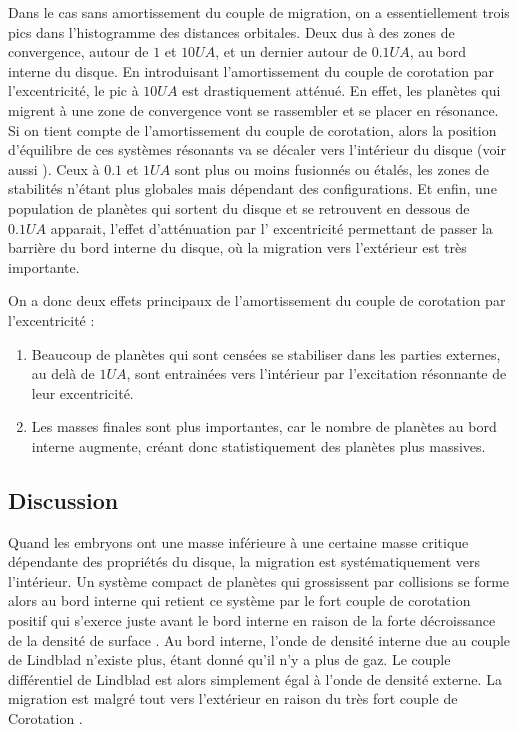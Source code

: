 Dans le cas sans amortissement du couple de migration, on a essentiellement trois pics dans l'histogramme des distances orbitales. Deux dus à des zones de convergence, autour de $1$ et $10\unit{UA}$, et un dernier autour de $0.1\unit{UA}$, au bord interne du disque. En introduisant l'amortissement du couple de corotation par l'excentricité, le pic à $10\unit{UA}$ est drastiquement atténué. En effet, les planètes qui migrent à une zone de convergence vont se rassembler et se placer en résonance. Si on tient compte de l'amortissement du couple de corotation, alors la position d'équilibre de ces systèmes résonants va se décaler vers l'intérieur du disque \citep{cossou2013convergence} (voir aussi ). Ceux à $0.1$ et $1\unit{UA}$ sont plus ou moins fusionnés ou étalés, les zones de stabilités n'étant plus globales mais dépendant des configurations. Et enfin, une population de planètes qui sortent du disque et se retrouvent en dessous de $0.1\unit{UA}$ apparait, l'effet d'atténuation par l'
excentricité permettant de passer la barrière du bord interne du disque, où la migration vers l'extérieur est très importante.

On a donc deux effets principaux de l'amortissement du couple de corotation par l'excentricité : 
\begin{enumerate}
\item Beaucoup de planètes qui sont censées se stabiliser dans les parties externes, au delà de $1\unit{UA}$, sont entrainées vers l'intérieur par l'excitation résonnante de leur excentricité. 
\item Les masses finales sont plus importantes, car le nombre de planètes au bord interne augmente, créant donc statistiquement des planètes plus massives. 
\end{enumerate}

\subsection{Discussion}
Quand les embryons ont une masse inférieure à une certaine masse critique dépendante des propriétés du disque, la migration
est systématiquement vers l'intérieur. Un système compact de planètes qui grossissent par collisions se forme alors au bord
interne qui retient ce système par le fort couple de corotation positif qui s'exerce juste avant le bord interne en raison de la
forte décroissance de la densité de surface \citep{masset2006disk}. Au bord interne, l'onde de densité interne due au couple de
Lindblad n'existe plus, étant donné qu'il n'y a plus de gaz. Le couple différentiel de Lindblad est alors simplement égal à
l'onde de densité externe. La migration est malgré tout vers l'extérieur en raison du très fort couple de Corotation
\citep{masset2006disk}.

